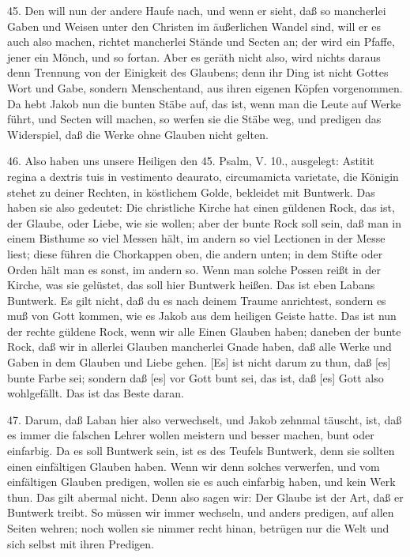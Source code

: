 45. Den will nun der andere Haufe nach, und wenn er sieht, daß so mancherlei Gaben
und Weisen unter den Christen im äußerlichen Wandel sind, will er es auch also machen, richtet mancherlei Stände und Secten an; der wird ein Pfaffe, jener ein Mönch, und so fortan. Aber es geräth nicht also, wird nichts daraus denn Trennung von der Einigkeit des Glaubens; denn ihr Ding ist nicht Gottes Wort und Gabe, sondern Menschentand, aus ihren eigenen Köpfen vorgenommen. Da hebt Jakob nun die bunten Stäbe auf, das ist, wenn man die Leute auf Werke führt, und Secten will machen, so werfen sie die Stäbe weg, und predigen das Widerspiel, daß die Werke ohne Glauben nicht gelten.

46. Also haben uns unsere Heiligen den 45. Psalm, V. 10., ausgelegt: Astitit regina a dextris tuis in vestimento deaurato, circumamicta varietate, die Königin stehet zu deiner Rechten, in köstlichem Golde, bekleidet mit Buntwerk. Das haben sie also gedeutet: Die christliche Kirche hat einen güldenen Rock, das ist, der Glaube, oder Liebe, wie sie wollen; aber der bunte Rock soll sein, daß man in einem Bisthume so viel Messen hält, im andern so viel Lectionen in der Messe liest; diese führen die Chorkappen oben, die andern unten; in dem Stifte oder Orden hält man es sonst, im andern so. Wenn man solche Possen reißt in der Kirche, was sie gelüstet, das soll hier Buntwerk heißen. Das ist eben Labans Buntwerk. Es gilt nicht, daß du es nach deinem Traume anrichtest, sondern es muß von Gott kommen, wie es Jakob aus dem heiligen Geiste hatte. Das ist nun der rechte güldene Rock, wenn wir alle Einen Glauben haben; daneben der bunte Rock, daß wir in allerlei Glauben mancherlei Gnade haben, daß alle Werke und Gaben in dem Glauben und Liebe gehen. [Es] ist nicht darum zu thun, daß [es] bunte Farbe sei; sondern daß [es] vor Gott bunt sei, das ist, daß [es] Gott also wohlgefällt. Das ist das Beste daran.

47. Darum, daß Laban hier also verwechselt, und Jakob zehnmal täuscht, ist, daß es immer die falschen Lehrer wollen meistern und besser machen, bunt oder einfarbig. Da es soll Buntwerk sein, ist es des Teufels Buntwerk, denn sie sollten einen einfältigen Glauben haben. Wenn wir denn solches verwerfen, und vom einfältigen Glauben predigen, wollen sie es auch einfarbig haben, und kein Werk thun. Das gilt abermal nicht. Denn also sagen wir: Der Glaube ist der Art, daß er Buntwerk treibt. So müssen wir immer wechseln, und anders predigen, auf allen Seiten wehren; noch wollen sie nimmer recht hinan, betrügen nur die Welt und sich selbst mit ihren Predigen.

